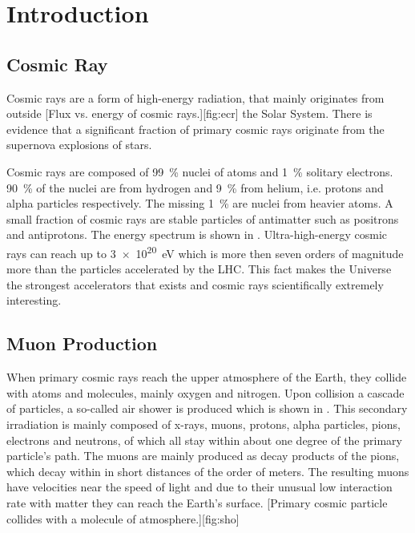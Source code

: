 \section{Introduction}
\subsection{Cosmic Ray}
Cosmic rays are a form of high-energy radiation, that mainly originates from outside
[Flux vs. energy of cosmic rays.][fig:ecr]
the Solar System. There is evidence that a significant fraction of primary cosmic rays originate from the supernova explosions of stars. \par 
Cosmic rays are composed of \SI{99}{\%} nuclei of atoms and \SI{1}{\%} solitary electrons.
\SI{90}{\%} of the nuclei are from hydrogen and \SI{9}{\%} from helium, i.e. protons and alpha particles respectively. The missing \SI{1}{\%} are nuclei from heavier atoms. A small fraction of cosmic rays are stable particles of antimatter such as positrons and antiprotons. The energy spectrum is shown in . Ultra-high-energy cosmic rays can reach up to \SI{3e20}{\electronvolt} which is more then seven orders of magnitude more than the particles accelerated by the \ac{LHC}. This fact makes the Universe the strongest accelerators that exists and cosmic rays scientifically extremely interesting.

\subsection{Muon Production}
When primary cosmic rays reach the upper atmosphere of the Earth, they collide with atoms and molecules, mainly oxygen and nitrogen. Upon collision a cascade of particles, a so-called air shower is produced which is shown in . This secondary irradiation is mainly composed of x-rays, muons, protons, alpha particles, pions, electrons and neutrons, of which all stay within about one degree of the primary particle's path. The muons are mainly produced as decay products of the pions, which decay within in short distances of the order of meters. The resulting muons have velocities near the speed of light and due to their unusual low interaction rate with matter they can reach the Earth's surface.
[Primary cosmic particle collides with a molecule of atmosphere.][fig:sho]

	






